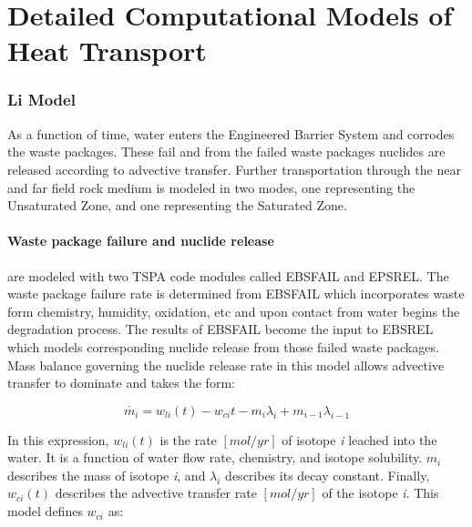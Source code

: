 \section{Detailed Computational Models of Heat Transport}
\label{sec:detailed_heat}






\subsubsection{Li Model\cite{li_methodology_2006}}
As a function of time, water enters the Engineered Barrier System and 
corrodes the waste packages.  These fail and from the failed waste 
packages nuclides are released according to advective transfer.  
Further transportation through the near and far field rock medium is 
modeled in two modes, one representing the Unsaturated Zone, and one 
representing the Saturated Zone.

\paragraph{Waste package failure and nuclide release} are modeled with 
two TSPA code modules called EBSFAIL and EPSREL. The waste package 
failure rate is determined from EBSFAIL which incorporates waste form 
chemistry, humidity, oxidation, etc and upon contact from water begins 
the degradation process. The results of EBSFAIL become the input to 
EBSREL which models corresponding nuclide release from those failed 
waste packages. Mass balance governing the nuclide release rate in 
this model allows advective transfer to dominate and takes the form:

\begin{equation}
\dot{m_i}=w_{li}(t)-w_{ci}{t}-m_i\lambda_i+m_{i-1}\lambda_{i-1}\nonumber
\end{equation}

In this expression, $w_{li}(t)$ is the rate $[mol/yr]$ of isotope 
\emph{i} leached into the water.  It is a function of water flow rate, 
chemistry, and isotope solubility. $m_i$ describes the mass of isotope 
\emph{i}, and $\lambda_i$ describes its decay constant. Finally, 
$w_{ci}(t)$ describes the advective transfer rate $[mol/yr]$ of the 
isotope \emph{i}. This model defines $w_{ci}$ as:


